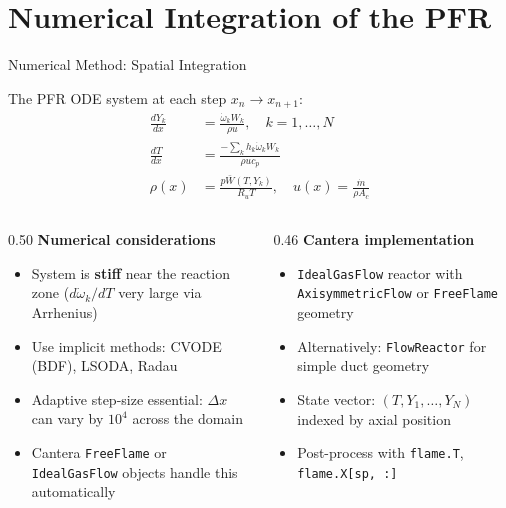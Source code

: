 \documentclass[12pt,aspectratio=169]{beamer}
\newcommand{\mdot}{\dot{m}}
\newcommand{\Ac}{A_c}
\newcommand{\wdot}{\dot{\omega}}
\newcommand{\code}[1]{\texttt{#1}}
\begin{document}
\section{Numerical Integration of the PFR}

\begin{frame}{Numerical Method: Spatial Integration}

  The PFR ODE system at each step $x_n \to x_{n+1}$:
  \begin{align*}
    \frac{dY_k}{dx} &= \frac{\wdot_k W_k}{\rho u}, \quad k = 1,\ldots,N \\[6pt]
    \frac{dT}{dx}   &= \frac{-\sum_k h_k \wdot_k W_k}{\rho u c_p} \\[6pt]
    \rho(x)         &= \frac{p\bar{W}(T,Y_k)}{R_u T}, \quad
    u(x) = \frac{\mdot}{\rho\Ac}
  \end{align*}

  \begin{columns}[t]
    \begin{column}{0.50\textwidth}
      \textbf{Numerical considerations}
      \begin{itemize}
        \item System is \textbf{stiff} near the reaction zone
              ($d\wdot_k/dT$ very large via Arrhenius)
        \item Use implicit methods: CVODE (BDF), LSODA, Radau
        \item Adaptive step-size essential: $\Delta x$ can vary
              by $10^4$ across the domain
        \item Cantera \code{FreeFlame} or \code{IdealGasFlow}
              objects handle this automatically
      \end{itemize}
    \end{column}
    \begin{column}{0.46\textwidth}
      \textbf{Cantera implementation}
      \begin{itemize}
        \item \code{IdealGasFlow} reactor with
              \code{AxisymmetricFlow} or
              \code{FreeFlame} geometry
        \item Alternatively: \code{FlowReactor}
              for simple duct geometry
        \item State vector: $(T, Y_1, \ldots, Y_N)$
              indexed by axial position
        \item Post-process with
              \code{flame.T}, \code{flame.X[sp, :]}
      \end{itemize}
    \end{column}
  \end{columns}
\end{frame}
\end{document}
